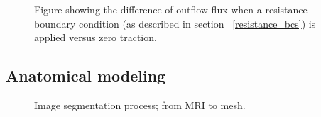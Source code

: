 \begin{figure}
  \begin{center}
  \end{center}
  \caption{Figure showing the difference of outflow flux when a resistance boundary condition
    (as described in section ~\ref{resistance_bcs}) is applied versus zero traction.}
  \label{fig:resistance_bcs_fig}
\end{figure}

\subsection{Anatomical modeling} \label{vmtk}

\begin{figure} \label{fig:imagseg}
  \begin{center}
    \caption{Image segmentation process; from MRI to mesh.}
  \end{center}
\end{figure}

